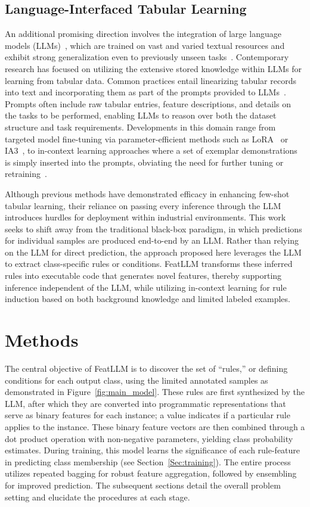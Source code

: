 \subsection{Language-Interfaced Tabular Learning} An additional promising direction involves the integration of large language models (LLMs)~\cite{anil2023palm,openai2023gpt4}, which are trained on vast and varied textual resources and exhibit strong generalization even to previously unseen tasks~\cite{brown2020language}. Contemporary research has focused on utilizing the extensive stored knowledge within LLMs for learning from tabular data. Common practices entail linearizing tabular records into text and incorporating them as part of the prompts provided to LLMs~\cite{dinh2022lift,hegselmann2023tabllm,wang2023anypredict}. Prompts often include raw tabular entries, feature descriptions, and details on the tasks to be performed, enabling LLMs to reason over both the dataset structure and task requirements. Developments in this domain range from targeted model fine-tuning via parameter-efficient methods such as LoRA~\cite{hu2021lora} or IA3~\cite{liu2022few}, to in-context learning approaches where a set of exemplar demonstrations is simply inserted into the prompts, obviating the need for further tuning or retraining~\cite{dinh2022lift,hegselmann2023tabllm,nam2023semi,slack2023tablet}.

Although previous methods have demonstrated efficacy in enhancing few-shot tabular learning, their reliance on passing every inference through the LLM introduces hurdles for deployment within industrial environments. This work seeks to shift away from the traditional black-box paradigm, in which predictions for individual samples are produced end-to-end by an LLM. Rather than relying on the LLM for direct prediction, the approach proposed here leverages the LLM to extract class-specific rules or conditions. \textsf{FeatLLM} transforms these inferred rules into executable code that generates novel features, thereby supporting inference independent of the LLM, while utilizing in-context learning for rule induction based on both background knowledge and limited labeled examples.

\section{Methods}
The central objective of \textsf{FeatLLM} is to discover the set of “rules,” or defining conditions for each output class, using the limited annotated samples as demonstrated in Figure~\ref{fig:main_model}. These rules are first synthesized by the LLM, after which they are converted into programmatic representations that serve as binary features for each instance; a value indicates if a particular rule applies to the instance. These binary feature vectors are then combined through a dot product operation with non-negative parameters, yielding class probability estimates. During training, this model learns the significance of each rule-feature in predicting class membership (see Section~\ref{Sec:training}). The entire process utilizes repeated bagging for robust feature aggregation, followed by ensembling for improved prediction. The subsequent sections detail the overall problem setting and elucidate the procedures at each stage.

